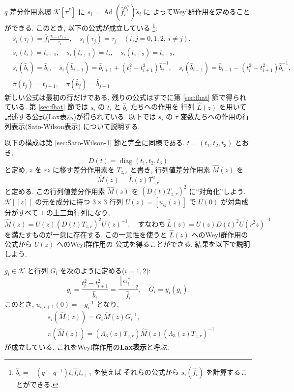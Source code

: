 \documentclass[12pt,twoside,dvipdfm]{msjproc}
\theoremstyle{definition} %
\theoremstyle{definition} %
\theoremstyle{definition} %
\numberwithin{theorem}{section}
\numberwithin{equation}{section}
\numberwithin{figure}{section}
\numberwithin{table}{section}
\newcommand\secref[1]{第 \ref{#1} 節}
\newcommand\K{\mathcal{K}}
\newcommand\diag{\mathop{\mathrm{diag}}\nolimits}
\newcommand\Ad{\mathop{\mathrm{Ad}}\nolimits}
\newcommand\ts{{\tilde{s}}}
\newcommand\hL{{\widehat{L}}}
\newcommand\hM{{\widehat{M}}}
\newcommand\hb{{\hat{b}}}
\newcommand\hf{{\hat{f}}}
\newcommand\av{\alpha^\vee}
\begin{document}
$q$ 差分作用素環 $\K[\tau^P]$ に $s_i=\Ad(\hf_i^{\av_i})\ts_i$ に
よってWeyl群作用を定めることができる. このとき, 以下の公式が成立している%
\footnote{$\hb_i=-(q-q^{-1})t_i\hf_i t_{i+1}$ を使えば
それらの公式から $s_i(\hf_i)$ を計算することができる.}:
\begin{align*}
 &
 s_i(\tau_i) = \hf_i \frac{\tau_{i-1}\tau_{i+1}}{\tau_i}, \quad
 s_i(\tau_j) = \tau_j \quad
 (i,j=0,1,2,\ i\ne j),
 \\ &
 s_i(t_i) = t_{i+1}, \quad
 s_i(t_{i+1}) = t_i, \quad
 s_i(t_{i+2}) = t_{i+2},
 \\ &
 s_i(\hb_i) = \hb_i, \quad
 s_i(\hb_{i+1}) = \hb_{i+1} + (t_i^2-t_{i+1}^2)\hb_i^{-1}, \quad
 s_i(\hb_{i-1}) = \hb_{i-1} - (t_i^2-t_{i+1}^2)\hb_i^{-1},
 \\ &
 \pi(t_j) = t_{j+1}, \quad
 \pi(\hb_j) = \hb_{j+1}.
\end{align*}
新しい公式は最初の行だけである, 
残りの公式はすでに\secref{sec:fhat}で得られている.
\secref{sec:fhat}では $s_i$ の $t_i$ と $\hb_i$ たちへの作用を
行列 $\hL(z)$ を用いて記述する公式(Lax表示)が得られている.
以下では $s_i$ の $\tau$ 変数たちへの作用の行列表示(Sato-Wilson表示)
について説明する.

以下の構成は\secref{sec:Sato-Wilson-1}と完全に同様である.
$t=(t_1,t_2,t_3)$ とおき,
\begin{equation*}
 D(t)=\diag(t_1,t_2,t_3)
\end{equation*}
と定め, $z$ を $rz$ に移す差分作用素を $T_{z,r}$ と書き, 
行列値差分作用素 $\hM(z)$ を
\begin{equation*}
  \hM(z) = \hL(z)T_{z,r}^2
\end{equation*}
と定める. この行列値差分作用素 $\hM(z)$ を $(D(t)T_{z,r})^2$ に``対角化''しよう.
$\K[[z]]$ の元を成分に持つ $3\times 3$ 行列 $U(z)=[u_{ij}(z)]$ 
で $U(0)$ が対角成分がすべて $1$ の上三角行列になり, 
\begin{equation*}
  \hM(z) = U(z)(D(t)T_{z,r})^2U(z)^{-1},
  \quad
  \text{すなわち}\ \hL(z)=U(z)D(t)^2U(r^2z)^{-1}
\end{equation*}
を満たすものが一意に存在する.  
この一意性を使うと $\hL(z)$ へのWeyl群作用の公式から $U(z)$ へのWeyl群作用の
公式を得ることができる. 結果を以下で説明しよう.

$g_i\in\K$ と行列 $G_i$ を次のように定める($i=1,2$):
\begin{equation*}
 g_i = \frac{t_i^2-t_{i+1}^2}{\hb_i} = \frac{[\av_i]_q}{\hf_i}, \quad
 G_i = y_i(g_i).
\end{equation*}
このとき, $u_{i,i+1}(0) =  -g_i^{-1}$ となり, 
\begin{align*}
 &
 s_i(\hM(z)) = G_i \hM(z) G_i^{-1},
 \\ &
 \pi(\hM(z)) = (\Lambda_3(z)T_{z,r})\hM(z)(\Lambda_3(z)T_{z,r})^{-1}
\end{align*}
が成立している. これをWeyl群作用の{\bf Lax表示}と呼ぶ.
\end{document}

